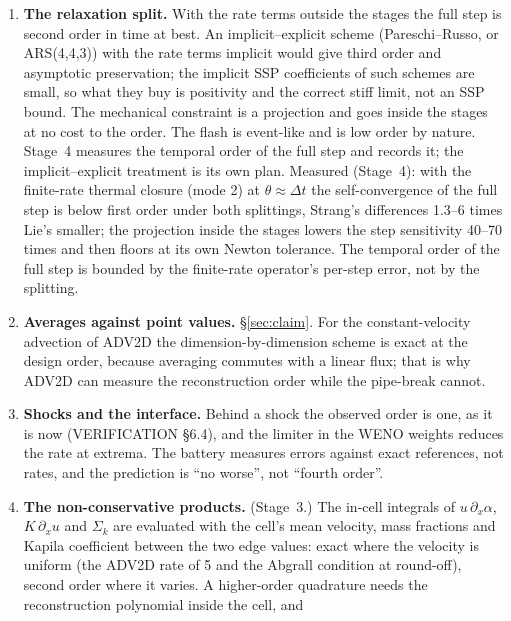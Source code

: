 \documentclass[11pt,a4paper]{article}
\newcommand{\Dt}{\Delta t}
\begin{document}
\begin{enumerate}[nosep]
\item \textbf{The relaxation split.}  With the rate terms outside the
      stages the full step is second order in time at best.  An
      implicit--explicit scheme (Pareschi--Russo, or ARS(4,4,3)) with the
      rate terms implicit would give third order and asymptotic
      preservation; the implicit SSP coefficients of such schemes are small,
      so what they buy is positivity and the correct stiff limit, not an
      SSP bound.  The mechanical constraint is a projection and goes inside
      the stages at no cost to the order.  The flash is event-like and is
      low order by nature.  Stage~4 measures the temporal order of the full
      step and records it; the implicit--explicit treatment is its own plan.
      Measured (Stage~4): with the finite-rate thermal closure (mode 2)
      at $\theta\approx\Dt$ the self-convergence of the full step is
      below first order under both splittings, Strang's differences
      1.3--6 times Lie's smaller; the projection inside the stages lowers
      the step sensitivity 40--70 times and then floors at its own Newton
      tolerance.  The temporal order of the full step is bounded by the
      finite-rate operator's per-step error, not by the splitting.
\item \textbf{Averages against point values.}  \S\ref{sec:claim}.  For
      the constant-velocity advection of ADV2D the dimension-by-dimension
      scheme is exact at the design order, because averaging commutes with
      a linear flux; that is why ADV2D can measure the reconstruction order
      while the pipe-break cannot.
\item \textbf{Shocks and the interface.}  Behind a shock the observed order
      is one, as it is now (VERIFICATION \S6.4), and the limiter in the
      WENO weights reduces the rate at extrema.  The battery measures
      errors against exact references, not rates, and the prediction is
      ``no worse'', not ``fourth order''.
\item \textbf{The non-conservative products.}  (Stage~3.)  The in-cell
      integrals of $u\,\partial_x\alpha$, $K\,\partial_x u$ and $\Sigma_k$
      are evaluated with the cell's mean velocity, mass fractions and
      Kapila coefficient between the two edge values: exact where the
      velocity is uniform (the ADV2D rate of 5 and the Abgrall condition
      at round-off), second order where it varies.  A higher-order
      quadrature needs the reconstruction polynomial inside the cell, and

\end{enumerate}
\end{document}
